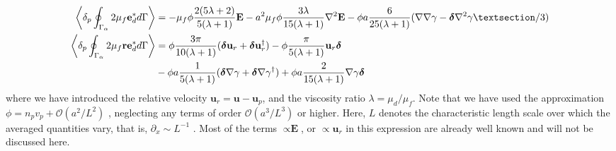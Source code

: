 \begin{align}
    \pSavg{ 2\mu_f \textbf{e}_d^*}
    &=
    -  \mu_f \phi \frac{2(5\lambda +2)}{5(\lambda+1)}\textbf{E}
    -  a^2 \mu_f \phi \frac{3\lambda}{15(\lambda+1)}\grad^2  \textbf{E}
    - \phi a  \frac{6}{25(\lambda+1)} (\grad\grad \gamma- \bm\delta\grad^2 \gamma§/3)\\
    \pSavg{ 2 \mu_f \textbf{re}_d^* }
    &=
    \phi \frac{3\pi}{10(\lambda+1)}
    (\bm\delta \textbf{u}_r +  \bm\delta\textbf{u}_r^\dagger)
    -\phi \frac{\pi}{5(\lambda+1)}\textbf{u}_r\bm\delta \\
    &-\phi a\frac{1}{5(\lambda+1)} (\bm\delta \grad \gamma+ \bm\delta\grad\gamma^\dagger)
    + \phi a\frac{2}{15(\lambda+1)}\grad\gamma\bm\delta 
    \label{eq:secondUN}
\end{align}
where we have introduced the relative velocity $\textbf{u}_r = \textbf{u} - \textbf{u}_p$, and the viscosity ratio $\lambda = \mu_d/\mu_f$. 
Note that we have used the approximation $\phi=n_pv_p + \mathcal{O}(a^2/L^2)$ , neglecting any terms of order $\mathcal{O}(a^3/L^3)$ or higher. 
Here, $L$ denotes the characteristic length scale over which the averaged quantities vary, that is, $\partial_x \sim L^{-1}$ \citep{jackson1997locally}. 
Most of the terms $\propto \textbf{E}$, or $\propto \textbf{u}_r$ in this expression are already well known and will not be discussed here. 



